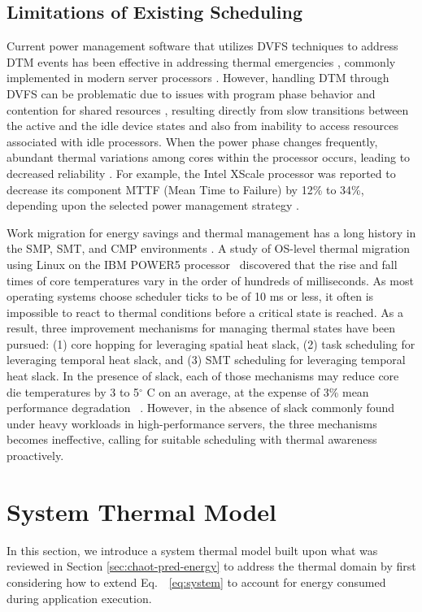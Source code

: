 \documentclass[times, 10pt,twocolumn]{IEEEtran}
\newcommand{\equationname}{Eq.\ }
\begin{document}
\subsection{Limitations of Existing Scheduling}
\label{sec:shortc-comp-workl}
Current power management software that utilizes DVFS techniques to
address DTM events has been effective in addressing thermal emergencies
\cite{Donald2006,Hanson2007}, commonly implemented in modern server
processors \cite{AMD2007,Intel2009}.  However, handling DTM through DVFS
can be problematic due to issues with program phase behavior and
contention for shared resources \cite{Bircher2008,Coskun2008d},
resulting directly from slow transitions between the active and the idle
device states and also from inability to access resources associated
with idle processors.  When the power phase changes frequently, abundant
thermal variations among cores within the processor occurs, leading to
decreased reliability \cite{Rosing2007,Coskun2008d,Kursun2009}.  For
example, the Intel XScale processor was reported to decrease its
component MTTF (Mean Time to Failure) by 12\% to 34\%, depending upon
the selected power management strategy \cite{Rosing2007}.

Work migration for energy savings and thermal management has a long
history in the SMP, SMT, and CMP environments
\cite{Yao1995,Gomaa2004,Kumar2006,Yang2008}.  A study of OS-level
thermal migration using Linux on the IBM POWER5
processor~\cite{Choi2007} discovered that the rise and fall times of
core temperatures vary in the order of hundreds of milliseconds.  As
most operating systems choose scheduler ticks to be of 10 ms or less, it
often is impossible to react to thermal conditions before a critical
state is reached.  As a result, three improvement mechanisms for
managing thermal states have been pursued: (1) core hopping for
leveraging spatial heat slack, (2) task scheduling for leveraging
temporal heat slack, and (3) SMT scheduling for leveraging temporal heat
slack.  In the presence of slack, each of those mechanisms may reduce
core die temperatures by 3 to 5$^{\circ}$ C on an average, at the
expense of 3\% mean performance degradation ~\cite{Choi2007,Ayoub2009}.
However, in the absence of slack commonly found under heavy workloads in
high-performance servers, the three mechanisms becomes ineffective,
calling for suitable scheduling with thermal awareness proactively.

\section{System Thermal Model}
\label{sec:model}
In this section, we introduce a system thermal model built upon what was
reviewed in Section \ref{sec:chaot-pred-energy} to address the thermal
domain by first considering how to extend
\equationname~\eqref{eq:system} to account for energy consumed during 
application execution.
\end{document}

